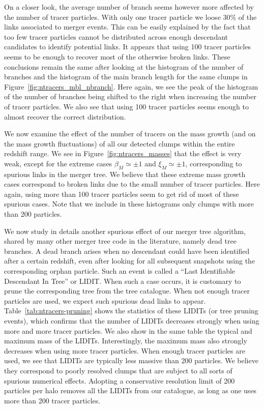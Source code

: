 On a closer look, the average number of branch seems however more
affected by the number of tracer particles.  With only one tracer
particle we loose 30\% of the links associated to merger events.  This
can be easily explained by the fact that too few tracer particles
cannot be distributed across enough descendant candidates to identify
potential links. It appears that using 100 tracer particles seems to
be enough to recover most of the otherwise broken links. These
conclusions remain the same after looking at the histogram of the
number of branches and the histogram of the main branch length for the
same clumps in Figure~\ref{fig:ntracers_mbl_nbranch}. Here again, we
see the peak of the histogram of the number of branches being shifted
to the right when increasing the number of tracer particles. We also
see that using 100 tracer particles seems enough to almost recover the
correct distribution.

We now examine the effect of the number of tracers on the mass growth
(and on the mass growth fluctuations) of all our detected clumps
within the entire redshift range. We see in
Figure~\ref{fig:ntracers_masses} that the effect is very weak, except
for the extreme cases $\beta_M \simeq \pm 1$ and $\xi_M \simeq \pm 1$,
corresponding to spurious links in the merger tree. We believe that
these extreme mass growth cases correspond to broken links due to the
small number of tracer particles. Here again, using more than 100
tracer particles seem to get rid of most of these spurious cases.
Note that we include in these histograms only clumps with more than
200 particles.

We now study in details another spurious effect of our merger tree
algorithm, shared by many other merger tree code in the literature,
namely dead tree branches.  A dead branch arises when no descendant
could have been identified after a certain redshift, even after
looking for all subsequent snapshots using the corresponding orphan
particle. Such an event is called a ``Last Identifiable Descendant In
Tree'' or LIDIT.  When such a case occurs, it is customary to prune
the corresponding tree from the tree catalogue. When not enough tracer
particles are used, we expect such spurious dead links to
appear. Table~\ref{tab:ntracers-pruning} shows the statistics of these
LIDITs (or tree pruning events), which confirms that the number of
LIDITs decreases strongly when using more and more tracer
particles. We also show in the same table the typical and maximum mass
of the LIDITs. Interestingly, the maximum mass also strongly decreases
when using more tracer particles. When enough tracer particles are
used, we see that LIDITs are typically less massive than 200
particles. We believe they correspond to poorly resolved clumps that
are subject to all sorts of spurious numerical effects. Adopting a
conservative resolution limit of 200 particles per halo removes all the
LIDITs from our catalogue, as long as one uses more than 200 tracer
particles. 

